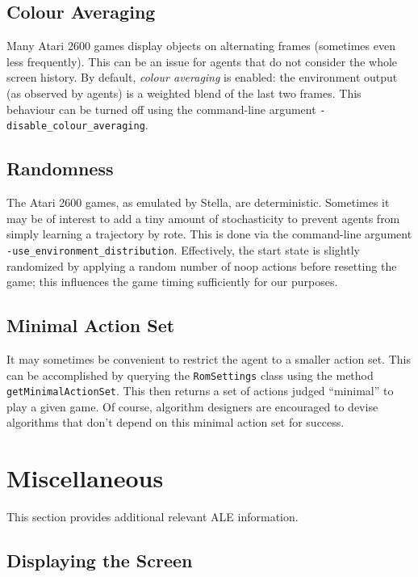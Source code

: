 \documentclass[12pt]{article}
\begin{document}
\subsection{Colour Averaging}

Many Atari 2600 games display objects on alternating frames (sometimes even less frequently).
This can be an issue for agents that do not consider the whole screen history. By default, 
\emph{colour averaging} is enabled: the environment output (as observed by agents) is a weighted
blend of the last two frames. This behaviour can be turned off using the command-line argument 
\verb+-disable_colour_averaging+. 

\subsection{Randomness}

The Atari 2600 games, as emulated by Stella, are deterministic. Sometimes it may be of interest
to add a tiny amount of stochasticity to prevent agents from simply learning a trajectory by
rote. This is done via the command-line argument \verb+-use_environment_distribution+. Effectively,
the start state is slightly randomized by applying a random number of noop actions before
resetting the game; this influences the game timing sufficiently for our purposes.

\subsection{Minimal Action Set}

It may sometimes be convenient to restrict the agent to a smaller action set. This can be
accomplished by querying the \verb+RomSettings+ class using the method 
\verb+getMinimalActionSet+. This then returns a set of actions judged ``minimal'' to play a given
game. Of course, algorithm designers are encouraged to devise algorithms that don't depend 
on this minimal action set for success.

\section{Miscellaneous}

This section provides additional relevant ALE information.

\subsection{Displaying the Screen}
\end{document}
